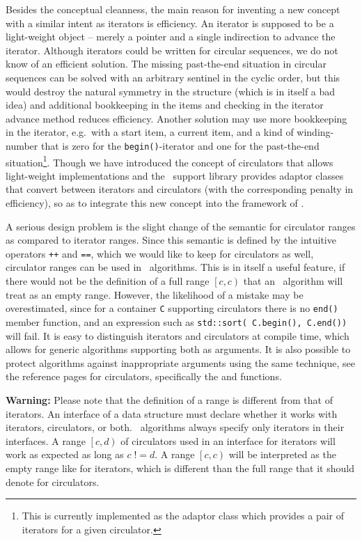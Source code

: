 Besides the conceptual cleanness, the main reason for inventing a new
concept with a similar intent as iterators is efficiency. An iterator
is supposed to be a light-weight object -- merely a pointer and a
single indirection to advance the iterator.  Although iterators could
be written for circular sequences, we do not know of an efficient
solution. The missing past-the-end situation in circular sequences can
be solved with an arbitrary sentinel in the cyclic order, but this
would destroy the natural symmetry in the structure (which is in
itself a bad idea) and additional bookkeeping in the items and
checking in the iterator advance method reduces efficiency.  Another
solution may use more bookkeeping in the iterator, e.g.~with a start
item, a current item, and a kind of winding-number that is zero for
the {\tt begin()}-iterator and one for the past-the-end
situation\footnote{This is currently implemented as the
  adaptor class which provides a pair of iterators for a given
  circulator.}.  Though we have introduced the concept of circulators
that allows light-weight implementations and the \cgal\ support
library provides adaptor classes that convert between iterators and
circulators (with the corresponding penalty in efficiency), so as to
integrate this new concept into the framework of \stl.

A serious design problem is the slight change of the semantic for
circulator ranges as compared to iterator ranges. Since this semantic
is defined by the intuitive operators {\tt ++} and {\tt ==}, which we
would like to keep for circulators as well, circulator ranges can be
used in \stl\ algorithms. This is in itself a useful feature, if there
would not be the definition of a full range $\left[c, c\right)$ that
an \stl\ algorithm will treat as an empty range. However, the
likelihood of a mistake may be overestimated, since for a container
{\tt C} supporting circulators there is no {\tt end()} member
function, and an expression such as {\tt std::sort( C.begin(),
  C.end())} will fail.  It is easy to distinguish iterators and
circulators at compile time, which allows for generic algorithms
supporting both as arguments.  It is also possible to protect
algorithms against inappropriate arguments using the same technique,
see the reference pages for circulators, specifically the
 and  functions.

{\bf Warning:} Please note that the definition of a range is different
from that of iterators. An interface of a data structure must declare
whether it works with iterators, circulators, or both. \stl\ 
algorithms always specify only iterators in their interfaces. A range
$\left[c, d\right)$ of circulators used in an interface for iterators
will work as expected as long as $c\; !\!= d$. A range $\left[c,
  c\right)$ will be interpreted as the empty range like for iterators,
which is different than the full range that it should denote for
circulators.

